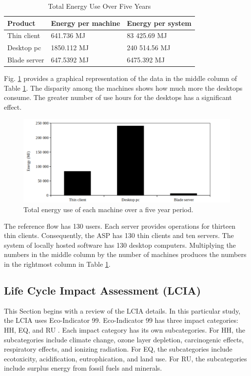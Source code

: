 \documentclass[final,journal,10pt,letterpaper,oneside,twocolumn,compsoc]%
{IEEEtran}
\begin{document}
\begin{table}[t!]
  \caption{Total Energy Use Over Five Years}
  \label{tab:7}
  \centering
    \begin{tabular}{|l|l|l|}
    \hline
    Product      & Energy per machine & Energy per system \\
    \hline
    Thin client  & 641.736 MJ         & 83 425.69 MJ \\
    Desktop pc   & 1850.112 MJ        & 240 514.56 MJ \\
    Blade server & 647.5392 MJ        & 6475.392 MJ \\
    \hline
    \end{tabular}
\end{table}

Fig. \ref{fig:tab1} provides a graphical representation of the data in the
middle column of Table \ref{tab:7}. The disparity among the machines shows how
much more the desktops consume. The greater number of use hours for the desktops
has a significant effect.

\begin{figure}[t!]
  \centering
    \includegraphics[scale=0.425]{total_energy_use_over_five_years}
  \caption{Total energy use of each machine over a five year period.}
  \label{fig:tab1}
\end{figure}

The reference flow has 130 users. Each server provides operations for thirteen
thin
clients. Consequently, the ASP has 130 thin clients and ten servers. The system
of locally hosted software has 130 desktop computers. Multiplying the numbers in
the middle column by the number of machines produces the numbers in the
rightmost column in Table \ref{tab:7}.

\subsection{Life Cycle Impact Assessment (LCIA)}
This Section begins with a review of the LCIA details. In this particular study,
the LCIA uses
Eco-Indicator 99. Eco-Indicator 99 has three impact categories: HH,
EQ, and RU \cite{pre}. Each impact category has its own
subcategories. For HH, the subcategories include climate
change, ozone layer depletion, carcinogenic effects, respiratory effects, and
ionizing radiation. For EQ, the subcategories include ecotoxicity,
acidification, eutrophication, and land use. For RU, the subcategories
include surplus energy from fossil fuels and minerals. 
\end{document}
